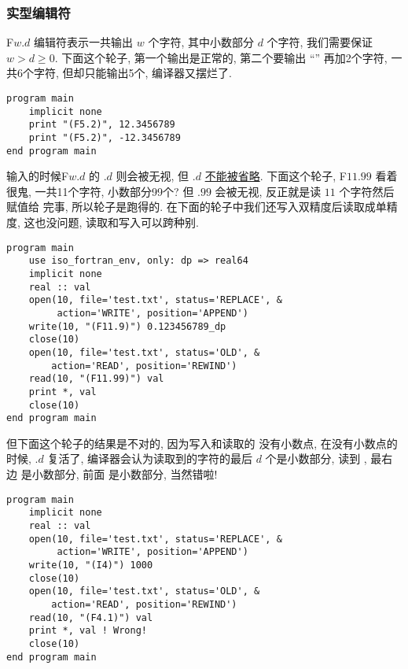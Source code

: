 \subsubsection{实型编辑符}

F$ w. d $ 编辑符表示一共输出 $ w $ 个字符, 其中小数部分 $ d $ 个字符, 我们需要保证 $ w>d\geqslant0 $. 下面这个轮子, 第一个输出是正常的, 第二个要输出 ``'' 再加2个字符, 一共6个字符, 但却只能输出5个, 编译器又摆烂了. 
\begin{lstlisting}
program main
    implicit none
    print "(F5.2)", 12.3456789
    print "(F5.2)", -12.3456789
end program main
\end{lstlisting}

输入的时候F$ w. d $ 的 $. d $ 则会被无视, 但 $.d$ \uline{不能被省略}. 下面这个轮子, F$ 11.99 $ 看着很鬼, 一共11个字符, 小数部分99个? 但 $.99 $ 会被无视, 反正就是读 $ 11 $ 个字符然后赋值给  完事, 所以轮子是跑得的. 在下面的轮子中我们还写入双精度后读取成单精度, 这也没问题, 读取和写入可以跨种别. 
\begin{lstlisting}
program main
    use iso_fortran_env, only: dp => real64
    implicit none
    real :: val
    open(10, file='test.txt', status='REPLACE', &
         action='WRITE', position='APPEND')
    write(10, "(F11.9)") 0.123456789_dp
    close(10)
    open(10, file='test.txt', status='OLD', &
        action='READ', position='REWIND')
    read(10, "(F11.99)") val
    print *, val
    close(10)
end program main
\end{lstlisting}
但下面这个轮子的结果是不对的, 因为写入和读取的  没有小数点, 在没有小数点的时候, $. d $ 复活了, 编译器会认为读取到的字符的最后 $ d $ 个是小数部分, 读到 , 最右边  是小数部分, 前面  是小数部分, 当然错啦!
\begin{lstlisting}
program main
    implicit none
    real :: val
    open(10, file='test.txt', status='REPLACE', &
         action='WRITE', position='APPEND')
    write(10, "(I4)") 1000
    close(10)
    open(10, file='test.txt', status='OLD', &
        action='READ', position='REWIND')
    read(10, "(F4.1)") val
    print *, val ! Wrong!
    close(10)
end program main
\end{lstlisting}


